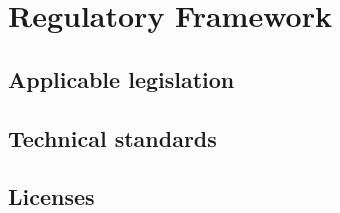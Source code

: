 \chapter{Regulatory Framework}\label{chap:regulation}

\section{Applicable legislation}




\section{Technical standards}




\section{Licenses}

